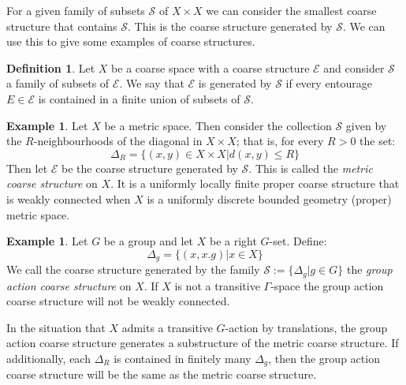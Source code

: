 \documentclass[11pt,a4paper]{amsart}
\theoremstyle{plain}
\theoremstyle{definition}%
\newtheorem{definition}[theorem]{Definition}%
\newtheorem{example}[theorem]{Example}%
\theoremstyle{remark}%
\begin{document}
For a given family of subsets $\mathcal{S}$ of $X \times X$ we can consider the smallest coarse structure that contains $\mathcal{S}$. This is the coarse structure generated by $\mathcal{S}$. We can use this to give some examples of coarse structures.

\begin{definition}
Let $X$ be a coarse space with a coarse structure $\mathcal{E}$ and consider $\mathcal{S}$ a family of subsets of $\mathcal{E}$. We say that $\mathcal{E}$ is generated by $\mathcal{S}$ if every entourage $E \in \mathcal{E}$ is contained in a finite union of subsets of $\mathcal{S}$.
\end{definition}

\begin{example}\label{ex:MCS}
Let $X$ be a metric space. Then consider the collection $\mathcal{S}$ given by the $R$-neighbourhoods of the diagonal in $X\times X$; that is, for every $R>0$ the set:
\begin{equation*}
\Delta_{R}=\lbrace (x,y) \in X \times X | d(x,y)\leq R \rbrace
\end{equation*}
Then let $\mathcal{E}$ be the coarse structure generated by $\mathcal{S}$. This is called the \textit{metric coarse structure} on $X$. It is a uniformly locally finite proper coarse structure that is weakly connected when $X$ is a uniformly discrete bounded geometry (proper) metric space.
\end{example}

\begin{example}\label{ex:GACS}
Let $G$ be a group and let $X$ be a right $G$-set. Define:
\begin{equation*}
\Delta_{g}=\lbrace (x,x.g) | x \in X \rbrace  
\end{equation*}
We call the coarse structure generated by the family $\mathcal{S}:=\lbrace \Delta_{g} | g\in G\rbrace$ the \textit{group action coarse structure} on $X$. If $X$ is not a transitive $\Gamma$-space the group action coarse structure will not be weakly connected.
\end{example}

In the situation that $X$ admits a transitive $G$-action by translations, the group action coarse structure generates a substructure of the metric coarse structure. If additionally, each $\Delta_{R}$ is contained in finitely many $\Delta_{g}$, then the group action coarse structure will be the same as the metric coarse structure.
\end{document}

